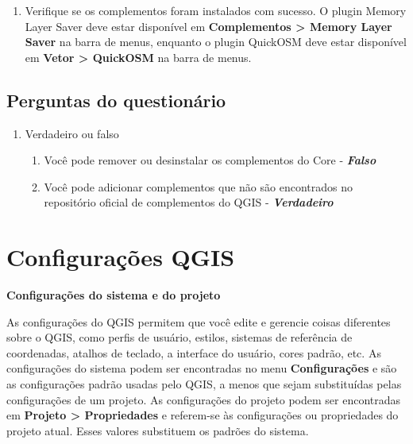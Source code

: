 \documentclass[
  portuguese,
]{krantz}
\providecommand{\tightlist}{%
  \setlength{\itemsep}{0pt}\setlength{\parskip}{0pt}}
\begin{document}
\begin{enumerate}
\def\labelenumi{\arabic{enumi}.}
\setcounter{enumi}{2}
\tightlist
\item
  Verifique se os complementos foram instalados com sucesso. O plugin Memory Layer Saver deve estar disponível em \textbf{Complementos \textgreater{} Memory Layer Saver} na barra de menus, enquanto o plugin QuickOSM deve estar disponível em \textbf{Vetor \textgreater{} QuickOSM} na barra de menus.
\end{enumerate}

\hypertarget{perguntas-do-questionuxe1rio-2}{%
\subsection{\texorpdfstring{\textbf{Perguntas do questionário}}{Perguntas do questionário}}\label{perguntas-do-questionuxe1rio-2}}

\begin{enumerate}
\def\labelenumi{\arabic{enumi}.}
\tightlist
\item
  Verdadeiro ou falso

  \begin{enumerate}
  \def\labelenumii{\arabic{enumii}.}
  \tightlist
  \item
    Você pode remover ou desinstalar os complementos do Core - \textbf{\emph{Falso}}
  \item
    Você pode adicionar complementos que não são encontrados no repositório oficial de complementos do QGIS - \textbf{\emph{Verdadeiro}}
  \end{enumerate}
\end{enumerate}

\hypertarget{configurauxe7uxf5es-qgis}{%
\section{Configurações QGIS}\label{configurauxe7uxf5es-qgis}}

\textbf{Configurações do sistema e do projeto}

As configurações do QGIS permitem que você edite e gerencie coisas diferentes sobre o QGIS, como perfis de usuário, estilos, sistemas de referência de coordenadas, atalhos de teclado, a interface do usuário, cores padrão, etc. As configurações do sistema podem ser encontradas no menu \textbf{Configurações} e são as configurações padrão usadas pelo QGIS, a menos que sejam substituídas pelas configurações de um projeto. As configurações do projeto podem ser encontradas em \textbf{Projeto \textgreater{} Propriedades} e referem-se às configurações ou propriedades do projeto atual. Esses valores substituem os padrões do sistema.
\end{document}
